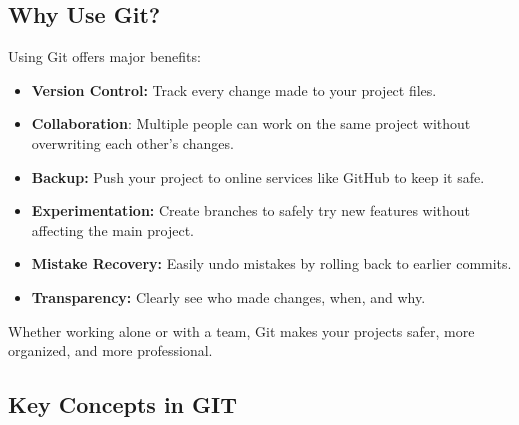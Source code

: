 \documentclass[
  11pt,
  a4paper,
]{article}
\begin{document}
\newpage

\subsection{Why Use Git?}\label{why-use-git}

Using Git offers major benefits:

\begin{itemize}
\item
  \textbf{Version Control:} Track every change made to your project
  files.
\item
  \textbf{Collaboration}: Multiple people can work on the same project
  without overwriting each other's changes.
\item
  \textbf{Backup:} Push your project to online services like GitHub to
  keep it safe.
\item
  \textbf{Experimentation:} Create branches to safely try new features
  without affecting the main project.
\item
  \textbf{Mistake Recovery:} Easily undo mistakes by rolling back to
  earlier commits.
\item
  \textbf{Transparency:} Clearly see who made changes, when, and why.
\end{itemize}

Whether working alone or with a team, Git makes your projects safer,
more organized, and more professional.

\newpage

\subsection{Key Concepts in GIT}\label{key-concepts-in-git}
\end{document}
